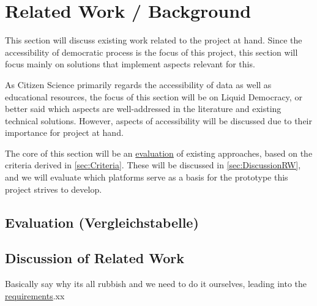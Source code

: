 \chapter{Related Work / Background}
\label{ch:RelatedWork}


This section will discuss existing work related to the project at hand. Since the accessibility of democratic process is the focus of this project, this section will focus mainly on solutions that implement aspects relevant for this. 

As Citizen Science primarily regards the accessibility of data as well as educational resources, the focus of this section will be on Liquid Democracy, or better said which aspects are well-addressed in the literature and existing technical solutions. However, aspects of accessibility will be discussed due to their importance for project at hand.

The core of this section will be an \hyperref[sec:Evaluation]{evaluation} of existing approaches, based on the criteria derived in \ref{sec:Criteria}. These will be discussed in \autoref{sec:DiscussionRW}, and we will evaluate which platforms serve as a basis for the prototype this project strives to develop.

\section{Evaluation (Vergleichstabelle)}
\label{sec:Evaluation}
\section{Discussion of Related Work}
\label{sec:DiscussionRW}
Basically say why its all rubbish and we need to do it ourselves, leading into the \hyperref[ch:ProjectRequirements]{requirements}.xx
